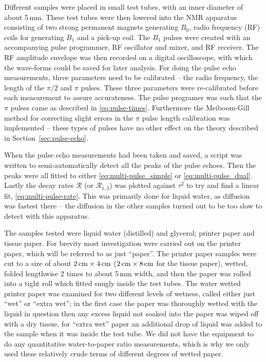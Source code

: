 \documentclass[11pt,a4paper, twocolumn,
swedish, english %
]{article}
\begin{document}
Different samples were placed in small test tubes, with an inner
diameter of about 5\,mm. These test tubes were then lowered into the
NMR apparatus consisting of two strong permanent magnets generating
$B_0$, radio frequency (RF) coils for generating $B_1$ and a pick-up
coil. The $B_1$ pulses were created with an accompanying pulse
programmer, RF oscillator and mixer, and RF receiver. The RF amplitude
envelope was then recorded on a digital oscilloscope, with which the
wave-forms could be saved for later analysis. 
For doing the pulse echo measurements, three parameters need to be
calibrated -- the radio frequency, the length of the $\pi/2$ and $\pi$
pulses. These three parameters were re-calibrated before each
measurement to assure accurateness. The pulse programer was such that
the $\pi$ pulses came as described in
\eqref{eq:pulse-times}. Furthermore the
Meiboom-Gill\cite{Meiboom-Gill1958} method for correcting slight
errors in the $\pi$ pulse length calibration was implemented -- these
types of pulses have no other effect on the theory described in
Section~\ref{sec:pulse-echo}. 

When the pulse echo measurements had been taken and saved, a script
was written to semi-automatically detect all the peaks
of the pulse echoes. Then the peaks were all fitted to either
\eqref{eq:multi-pulse_simple} or \eqref{eq:multi-pulse_dual}.
Lastly the decay rates $\mathcal{R}$ (or $\mathcal{R}_{1, 2}$) was
plotted against $\tau^2$ to try and find a linear fit,
\eqref{eq:multi-pulse-rate}.\footnotemark{} 
This was primarily done for liquid water, as diffusion was fastest
there -- the diffusion in the other samples turned out to be too slow
to detect with this apparatus. 


The samples tested were liquid water (distilled) and glycerol; 
printer paper and tissue paper. For brevity most investigation were
carried out on the printer paper, which will be referred to as just
``paper''. The printer paper samples were cut to a size of about  
$\unit[2]{cm}\times\unit[4]{cm}$ ($\unit[2]{cm}\times\unit[8]{cm}$ for
the tissue paper), wetted, folded lengthwise 2 times to about 5\,mm
width, and then the paper was rolled into a tight roll which fitted
snugly inside the test tubes.
The water wetted printer paper was examined for two different levels of
wetness, called either just ``wet'' or ``extra wet''; in the first
case the paper was thoroughly wetted with the liquid in question then
any excess liquid not soaked into the paper was wiped off with a dry
tissue, for ``extra wet'' paper an additional drop of liquid was added
to the sample when it was inside the test tube. We did not have the
equipment to do any quantitative water-to-paper ratio measurements,
which is why we only used these relatively crude terms of different
degrees of wetted paper.
\end{document}
